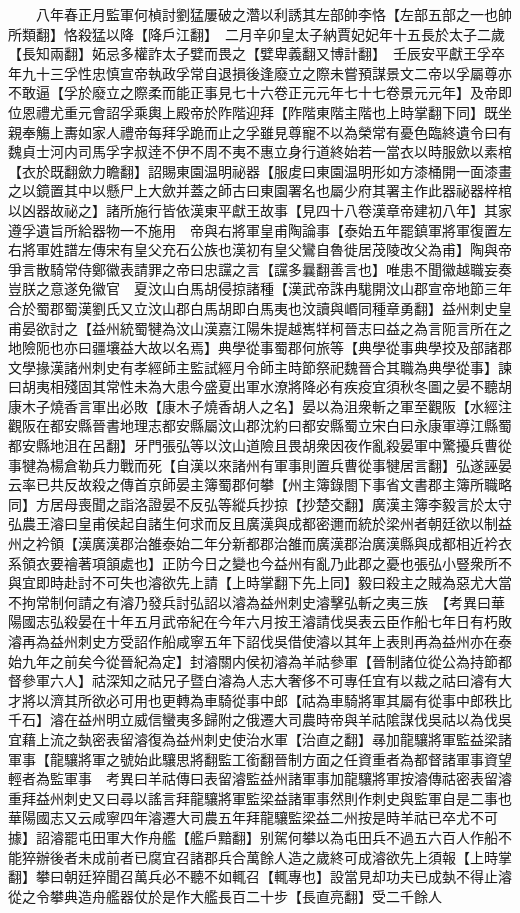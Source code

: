 　　八年春正月監軍何楨討劉猛屢破之濳以利誘其左部帥李恪【左部五部之一也帥所類翻】恪殺猛以降【降戶江翻】　二月辛卯皇太子納賈妃妃年十五長於太子二歲【長知兩翻】妬忌多權詐太子嬖而畏之【嬖卑義翻又博計翻】　壬辰安平獻王孚卒年九十三孚性忠慎宣帝執政孚常自退損後逢廢立之際未嘗預謀景文二帝以孚屬尊亦不敢逼【孚於廢立之際柔而能正事見七十六卷正元元年七十七卷景元元年】及帝即位恩禮尤重元會詔孚乘輿上殿帝於阼階迎拜【阼階東階主階也上時掌翻下同】既坐親奉觴上夀如家人禮帝每拜孚跪而止之孚雖見尊寵不以為榮常有憂色臨終遺令曰有魏貞士河内司馬孚字叔逹不伊不周不夷不惠立身行道終始若一當衣以時服歛以素棺【衣於既翻歛力瞻翻】詔賜東園温明祕器【服䖍曰東園温明形如方漆桶開一面漆畫之以鏡置其中以懸尸上大歛并蓋之師古曰東園署名也屬少府其署主作此器祕器梓棺以凶器故祕之】諸所施行皆依漢東平獻王故事【見四十八卷漢章帝建初八年】其家遵孚遺旨所給器物一不施用　帝與右將軍皇甫陶論事【泰始五年罷鎮軍將軍復置左右將軍姓譜左傳宋有皇父充石公族也漢初有皇父鸞自魯徙居茂陵改父為甫】陶與帝爭言散騎常侍鄭徽表請罪之帝曰忠讜之言【讜多曩翻善言也】唯患不聞徽越職妄奏豈朕之意遂免徽官　夏汶山白馬胡侵掠諸種【漢武帝誅冉駹開汶山郡宣帝地節三年合於蜀郡蜀漢劉氏又立汶山郡白馬胡即白馬夷也汶讀與㟭同種章勇翻】益州刺史皇甫晏欲討之【益州統蜀犍為汶山漢嘉江陽朱提越嶲䍧柯晉志曰益之為言阨言所在之地險阨也亦曰疆壤益大故以名焉】典學從事蜀郡何旅等【典學從事典學挍及部諸郡文學掾漢諸州刺史有孝經師主監試經月令師主時節祭祀魏晉合其職為典學從事】諫曰胡夷相殘固其常性未為大患今盛夏出軍水潦將降必有疾疫宜須秋冬圖之晏不聽胡康木子燒香言軍出必敗【康木子燒香胡人之名】晏以為沮衆斬之軍至觀阪【水經注觀阪在都安縣晉書地理志都安縣屬汶山郡沈約曰都安縣蜀立宋白曰永康軍導江縣蜀都安縣地沮在呂翻】牙門張弘等以汶山道險且畏胡衆因夜作亂殺晏軍中驚擾兵曹從事犍為楊倉勒兵力戰而死【自漢以來諸州有軍事則置兵曹從事犍居言翻】弘遂誣晏云率已共反故殺之傳首京師晏主簿蜀郡何攀【州主簿錄閤下事省文書郡主簿所職略同】方居母喪聞之詣洛證晏不反弘等縱兵抄掠【抄楚交翻】廣漢主簿李毅言於太守弘農王濬曰皇甫侯起自諸生何求而反且廣漢與成都密邇而統於梁州者朝廷欲以制益州之衿領【漢廣漢郡治雒泰始二年分新都郡治雒而廣漢郡治廣漢縣與成都相近衿衣系領衣要禬著項頷處也】正防今日之變也今益州有亂乃此郡之憂也張弘小豎衆所不與宜即時赴討不可失也濬欲先上請【上時掌翻下先上同】毅曰殺主之賊為惡尤大當不拘常制何請之有濬乃發兵討弘詔以濬為益州刺史濬擊弘斬之夷三族　【考異曰華陽國志弘殺晏在十年五月武帝紀在今年六月按王濬請伐吳表云臣作船七年日有朽敗濬再為益州刺史方受詔作船咸寧五年下詔伐吳借使濬以其年上表則再為益州亦在泰始九年之前矣今從晉紀為定】封濬關内侯初濬為羊祜參軍【晉制諸位從公為持節都督參軍六人】祜深知之祜兄子暨白濬為人志大奢侈不可專任宜有以裁之祜曰濬有大才將以濟其所欲必可用也更轉為車騎從事中郎【祜為車騎將軍其屬有從事中郎秩比千石】濬在益州明立威信蠻夷多歸附之俄遷大司農時帝與羊祜隂謀伐吳祜以為伐吳宜藉上流之埶密表留濬復為益州刺史使治水軍【治直之翻】㝷加龍驤將軍監益梁諸軍事【龍驤將軍之號始此驤思將翻監工銜翻晉制方面之任資重者為都督諸軍事資望輕者為監軍事　考異曰羊祜傳曰表留濬監益州諸軍事加龍驤將軍按濬傳祜密表留濬重拜益州刺史又曰尋以謠言拜龍驤將軍監梁益諸軍事然則作刺史與監軍自是二事也華陽國志又云咸寧四年濬遷大司農五年拜龍驤監梁益二州按是時羊祜已卒尤不可據】詔濬罷屯田軍大作舟艦【艦戶黯翻】别駕何攀以為屯田兵不過五六百人作船不能猝辦後者未成前者已腐宜召諸郡兵合萬餘人造之歲終可成濬欲先上須報【上時掌翻】攀曰朝廷猝聞召萬兵必不聽不如輒召【輒專也】設當見却功夫已成埶不得止濬從之令攀典造舟艦器仗於是作大艦長百二十步【長直亮翻】受二千餘人